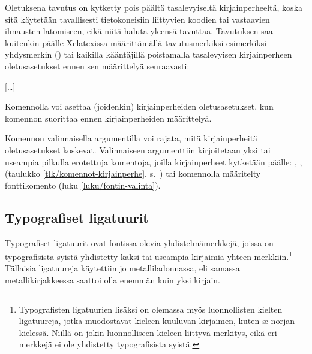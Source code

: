 Oletuksena tavutus on kytketty pois päältä tasalevyiseltä
kirjainperheeltä, koska sitä käytetään tavallisesti tietokoneisiin
liittyvien koodien tai vastaavien ilmausten latomiseen, eikä niitä
haluta yleensä tavuttaa. Tavutuksen saa kuitenkin päälle Xelatexissa
määrittämällä tavutusmerkiksi esimerkiksi yhdysmerkin
() tai kaikilla kääntäjillä poistamalla
tasalevyisen kirjainperheen oletusasetukset ennen sen määrittelyä
seuraavasti:

\begin{koodilohkosis}
\setmonofont{…}[…]
\end{koodilohkosis}

\noindent
Komennolla  voi asettaa (joidenkin)
kirjainperheiden oletusasetukset, kun komennon suorittaa ennen
kirjainperheiden määrittelyä.

\begin{koodilohkosis}
\end{koodilohkosis}

\noindent
Komennon valinnaisella argumentilla voi rajata, mitä kirjainperheitä
oletusasetukset koskevat. Valinnaiseen argumenttiin kirjoitetaan yksi
tai useampia pilkulla erotettuja komentoja, joilla kirjainperheet
kytketään päälle: , ,
 (taulukko \ref{tlk/komennot-kirjainperhe},
s.~\pageref{tlk/komennot-kirjainperhe}) tai komennolla
 määritelty fonttikomento (luku
\ref{luku/fontin-valinta}).

\subsection{Typografiset ligatuurit}
\label{luku/typo-liga}

Typografiset ligatuurit ovat fontissa olevia yhdistelmämerkkejä, joissa
on typografisista syistä yhdistetty kaksi tai useampia kirjaimia yhteen
merkkiin.\footnote{Typografisten ligatuurien lisäksi on olemassa myös
  luonnollisten kielten ligatuureja, jotka muodostavat kieleen kuuluvan
  kirjaimen, kuten æ norjan kielessä. Niillä on jokin luonnolliseen
  kieleen liittyvä merkitys, eikä eri merkkejä ei ole yhdistetty
  typografisista syistä.} Tällaisia ligatuureja käytettiin jo
metalliladonnassa, eli samassa metallikirjakkeessa saattoi olla enemmän
kuin yksi kirjain.

